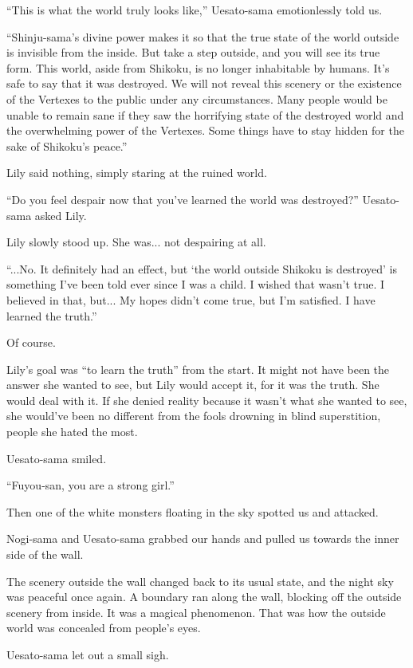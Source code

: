 ``This is what the world truly looks like,''  Uesato-sama emotionlessly told us.

``Shinju-sama's divine power makes it so that the true state of the world outside is invisible from the inside. But take a step outside, and you will see its true form. This world, aside from Shikoku, is no longer inhabitable by humans. It's safe to say that it was destroyed. We will not reveal this scenery or the existence of the Vertexes to the public under any circumstances. Many people would be unable to remain sane if they saw the horrifying state of the destroyed world and the overwhelming power of the Vertexes. Some things have to stay hidden for the sake of Shikoku's peace.''

Lily said nothing, simply staring at the ruined world.

``Do you feel despair now that you've learned the world was destroyed?'' Uesato-sama asked Lily.

Lily slowly stood up. She was... not despairing at all.

``...No. It definitely had an effect, but `the world outside Shikoku is destroyed' is something I've been told ever since I was a child. I wished that wasn't true. I believed in that, but... My hopes didn't come true, but I'm satisfied. I have learned the truth.''

Of course.

Lily's goal was ``to learn the truth'' from the start. It might not have been the answer she wanted to see, but Lily would accept it, for it was the truth. She would deal with it. If she denied reality because it wasn't what she wanted to see, she would've been no different from the fools drowning in blind superstition, people she hated the most.

Uesato-sama smiled.

``Fuyou-san, you are a strong girl.''

Then one of the white monsters floating in the sky spotted us and attacked.

Nogi-sama and Uesato-sama grabbed our hands and pulled us towards the inner side of the wall.

The scenery outside the wall changed back to its usual state, and the night sky was peaceful once again. A boundary ran along the wall, blocking off the outside scenery from inside. It was a magical phenomenon. That was how the outside world was concealed from people's eyes.

Uesato-sama let out a small sigh.

